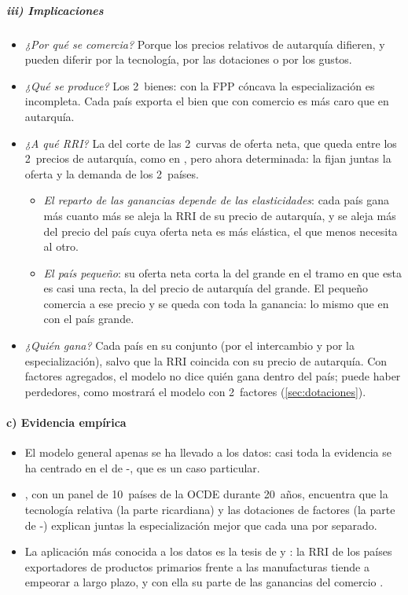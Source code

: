 \documentclass[11pt]{article}
\begin{document}
\subparagraph{iii) Implicaciones}

\begin{itemize}
\item \emph{¿Por qué se comercia?} Porque los precios relativos de autarquía difieren, y pueden diferir por la tecnología, por las dotaciones o por los gustos.
\item \emph{¿Qué se produce?} Los 2~bienes: con la FPP cóncava la especialización es incompleta. Cada país exporta el bien que con comercio es más caro que en autarquía.
\item \emph{¿A qué RRI?} La del corte de las 2~curvas de oferta neta, que queda entre los 2~precios de autarquía, como en , pero ahora determinada: la fijan juntas la oferta y la demanda de los 2~países.
  \begin{itemize}
  \item \emph{El reparto de las ganancias depende de las elasticidades}: cada país gana más cuanto más se aleja la RRI de su precio de autarquía, y se aleja más del precio del país cuya oferta neta es más elástica, el que menos necesita al otro.
  \item \emph{El país pequeño}: su oferta neta corta la del grande en el tramo en que esta es casi una recta, la del precio de autarquía del grande. El pequeño comercia a ese precio y se queda con toda la ganancia: lo mismo que en  con el país grande.
  \end{itemize}
\item \emph{¿Quién gana?} Cada país en su conjunto (por el intercambio y por la especialización), salvo que la RRI coincida con su precio de autarquía. Con factores agregados, el modelo no dice quién gana dentro del país; puede haber perdedores, como mostrará el modelo con 2~factores (\ref{sec:dotaciones}).
\end{itemize}

\paragraph{c) Evidencia empírica}

\begin{itemize}

\item El modelo general apenas se ha llevado a los datos: casi toda la evidencia se ha centrado en el de -, que es un caso particular.
\item \textcite{Harrigan1997Technology}, con un panel de 10~países de la OCDE durante 20~años, encuentra que la tecnología relativa (la parte ricardiana) y las dotaciones de factores (la parte de -) explican juntas la especialización mejor que cada una por separado.
\item La aplicación más conocida a los datos es la tesis de \textcite{Prebisch1949} y \textcite{Singer1950}: la RRI de los países exportadores de productos primarios frente a las manufacturas tiende a empeorar a largo plazo, y con ella su parte de las ganancias del comercio  .
\end{itemize}
\end{document}
